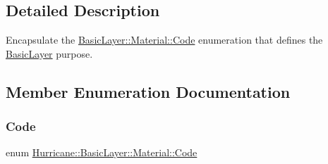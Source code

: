 \subsection{Detailed Description}
Encapsulate the \hyperlink{classHurricane_1_1BasicLayer_1_1Material_a3e815440ad4b86b3569fa54ca06fc3e8}{Basic\+Layer\+::\+Material\+::\+Code} enumeration that defines the \hyperlink{classHurricane_1_1BasicLayer}{Basic\+Layer} purpose. 

\subsection{Member Enumeration Documentation}
\mbox{\label{classHurricane_1_1BasicLayer_1_1Material_a3e815440ad4b86b3569fa54ca06fc3e8}} 
\subsubsection{\texorpdfstring{Code}{Code}}
{\footnotesize\ttfamily enum \hyperlink{classHurricane_1_1BasicLayer_1_1Material_a3e815440ad4b86b3569fa54ca06fc3e8}{Hurricane\+::\+Basic\+Layer\+::\+Material\+::\+Code}}

